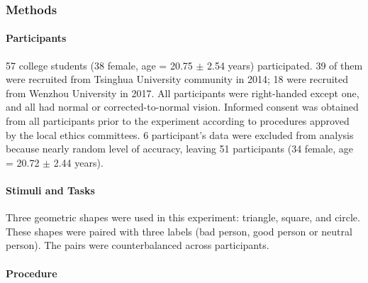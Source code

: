 \documentclass[
  english,
  man]{apa6}
\let\oldparagraph\paragraph
\renewcommand{\paragraph}[1]{\oldparagraph{#1}\mbox{}}
\begin{document}
\hypertarget{methods}{%
\subsubsection{Methods}\label{methods}}

\hypertarget{participants}{%
\paragraph{Participants}\label{participants}}

57 college students (38 female, age = 20.75 \(\pm\) 2.54 years) participated. 39 of them were recruited from Tsinghua University community in 2014; 18 were recruited from Wenzhou University in 2017. All participants were right-handed except one, and all had normal or corrected-to-normal vision. Informed consent was obtained from all participants prior to the experiment according to procedures approved by the local ethics committees. 6 participant's data were excluded from analysis because nearly random level of accuracy, leaving 51 participants (34 female, age = 20.72 \(\pm\) 2.44 years).

\hypertarget{stimuli-and-tasks}{%
\paragraph{Stimuli and Tasks}\label{stimuli-and-tasks}}

Three geometric shapes were used in this experiment: triangle, square, and circle. These shapes were paired with three labels (bad person, good person or neutral person). The pairs were counterbalanced across participants.

\hypertarget{procedure}{%
\paragraph{Procedure}\label{procedure}}
\end{document}
